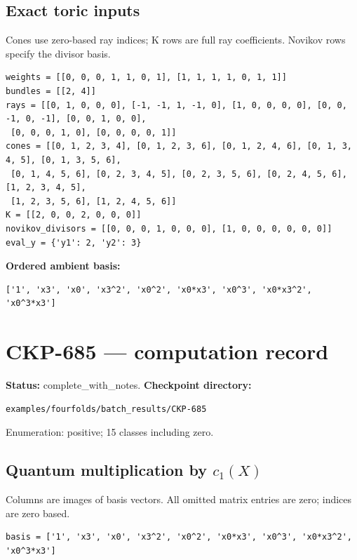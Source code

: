 \documentclass[10pt,a4paper]{article}
\begin{document}
\subsection*{Exact toric inputs}
Cones use zero-based ray indices; K rows are full ray coefficients. Novikov rows specify the divisor basis.

\begin{lstlisting}
weights = [[0, 0, 0, 1, 1, 0, 1], [1, 1, 1, 1, 0, 1, 1]]
bundles = [[2, 4]]
rays = [[0, 1, 0, 0, 0], [-1, -1, 1, -1, 0], [1, 0, 0, 0, 0], [0, 0, -1, 0, -1], [0, 0, 1, 0, 0],
 [0, 0, 0, 1, 0], [0, 0, 0, 0, 1]]
cones = [[0, 1, 2, 3, 4], [0, 1, 2, 3, 6], [0, 1, 2, 4, 6], [0, 1, 3, 4, 5], [0, 1, 3, 5, 6],
 [0, 1, 4, 5, 6], [0, 2, 3, 4, 5], [0, 2, 3, 5, 6], [0, 2, 4, 5, 6], [1, 2, 3, 4, 5],
 [1, 2, 3, 5, 6], [1, 2, 4, 5, 6]]
K = [[2, 0, 0, 2, 0, 0, 0]]
novikov_divisors = [[0, 0, 0, 1, 0, 0, 0], [1, 0, 0, 0, 0, 0, 0]]
eval_y = {'y1': 2, 'y2': 3}
\end{lstlisting}

\textbf{Ordered ambient basis:}
\begin{lstlisting}
['1', 'x3', 'x0', 'x3^2', 'x0^2', 'x0*x3', 'x0^3', 'x0*x3^2', 'x0^3*x3']
\end{lstlisting}

\clearpage\section*{CKP-685 --- computation record}
\textbf{Status:} complete\_with\_notes.
\textbf{Checkpoint directory:}
\begin{lstlisting}
examples/fourfolds/batch_results/CKP-685
\end{lstlisting}

Enumeration: positive; 15 classes including zero.
\subsection*{Quantum multiplication by $c_1(X)$}
Columns are images of basis vectors. All omitted matrix entries are zero; indices are zero based.

\begin{lstlisting}
basis = ['1', 'x3', 'x0', 'x3^2', 'x0^2', 'x0*x3', 'x0^3', 'x0*x3^2', 'x0^3*x3']
\end{lstlisting}
\end{document}
